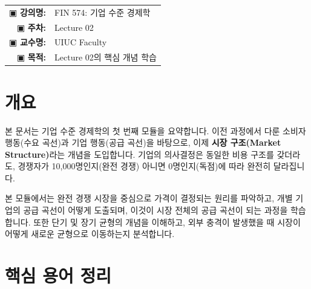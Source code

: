 \documentclass[11pt,a4paper]{article}
\makeatletter
\theoremstyle{definition}
\newcommand{\metainfo}[4]{
\begin{tcolorbox}[
    colback=lightpurple,
    colframe=darkpurple,
    boxrule=1pt,
    arc=2mm,
    left=10pt,
    right=10pt,
    top=8pt,
    bottom=8pt
]
\begin{tabular}{@{}rl@{}}
▣ \textbf{강의명:} & #1 \\[0.3em]
▣ \textbf{주차:} & #2 \\[0.3em]
▣ \textbf{교수명:} & #3 \\[0.3em]
▣ \textbf{목적:} & \begin{minipage}[t]{0.75\textwidth}#4\end{minipage}
\end{tabular}
\end{tcolorbox}
}
\makeatother
\begin{document}
\maketitle
\thispagestyle{firstpage}

\metainfo{FIN 574: 기업 수준 경제학}{Lecture 02}{UIUC Faculty}{Lecture 02의 핵심 개념 학습}


\tableofcontents

\newpage
\section{개요}

본 문서는 기업 수준 경제학의 첫 번째 모듈을 요약합니다.
이전 과정에서 다룬 소비자 행동(수요 곡선)과 기업 행동(공급 곡선)을 바탕으로,
이제 \textbf{시장 구조(Market Structure)}라는 개념을 도입합니다.
기업의 의사결정은 동일한 비용 구조를 갖더라도, 경쟁자가 10,000명인지(완전 경쟁) 아니면 0명인지(독점)에 따라 완전히 달라집니다.

본 모듈에서는 완전 경쟁 시장을 중심으로 가격이 결정되는 원리를 파악하고,
개별 기업의 공급 곡선이 어떻게 도출되며, 이것이 시장 전체의 공급 곡선이 되는 과정을 학습합니다.
또한 단기 및 장기 균형의 개념을 이해하고, 외부 충격이 발생했을 때 시장이 어떻게 새로운 균형으로 이동하는지 분석합니다.

\section{핵심 용어 정리}
\end{document}
